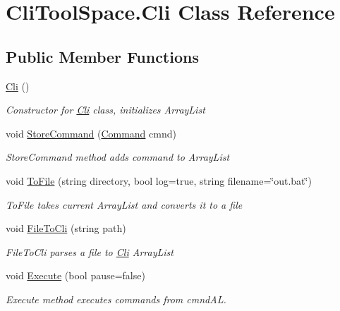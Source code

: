 \hypertarget{class_cli_tool_space_1_1_cli}{}\section{Cli\+Tool\+Space.\+Cli Class Reference}
\label{class_cli_tool_space_1_1_cli}


 


\subsection*{Public Member Functions}
\begin{DoxyCompactItemize}
\item 
\mbox{\hyperlink{class_cli_tool_space_1_1_cli_a063243e835cc8e87c67e2d1da0310572}{Cli}} ()
\begin{DoxyCompactList}\small\item\em Constructor for \mbox{\hyperlink{class_cli_tool_space_1_1_cli}{Cli}} class, initializes Array\+List \end{DoxyCompactList}\item 
void \mbox{\hyperlink{class_cli_tool_space_1_1_cli_a967aa1e2dc3b03e32b8373cbccab922c}{Store\+Command}} (\mbox{\hyperlink{class_cli_tool_space_1_1_command}{Command}} cmnd)
\begin{DoxyCompactList}\small\item\em Store\+Command method adds command to Array\+List \end{DoxyCompactList}\item 
void \mbox{\hyperlink{class_cli_tool_space_1_1_cli_a20d3ab2d3b6ddc56c74bf3a5dc98fd4d}{To\+File}} (string directory, bool log=true, string filename=\char`\"{}out.\+bat\char`\"{})
\begin{DoxyCompactList}\small\item\em To\+File takes current Array\+List and converts it to a file \end{DoxyCompactList}\item 
void \mbox{\hyperlink{class_cli_tool_space_1_1_cli_a8623bb3d3133538db1d87d42bda874f2}{File\+To\+Cli}} (string path)
\begin{DoxyCompactList}\small\item\em File\+To\+Cli parses a file to \mbox{\hyperlink{class_cli_tool_space_1_1_cli}{Cli}} Array\+List \end{DoxyCompactList}\item 
void \mbox{\hyperlink{class_cli_tool_space_1_1_cli_a8a2edf2f70eeb1ca7baae4d92e0a9ee5}{Execute}} (bool pause=false)
\begin{DoxyCompactList}\small\item\em Execute method executes commands from cmnd\+AL. \end{DoxyCompactList}\end{DoxyCompactItemize}

